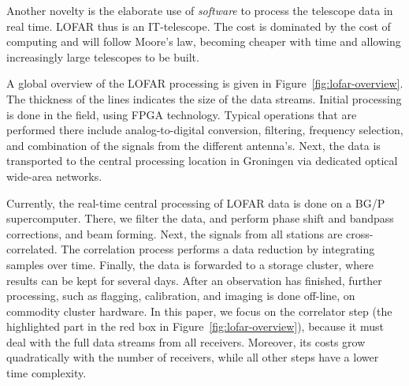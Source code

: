 \documentclass{article}
\newcommand{\longversion}[1]{}
\begin{document}
Another novelty is the elaborate
use of \emph{software\/} to process the telescope data in real time.
LOFAR thus is an IT-telescope. 
The cost
is dominated by the cost of computing and will follow Moore's law,
becoming cheaper with time and allowing increasingly large telescopes
to be built. 
\longversion{
LOFAR will enable exciting new science cases.  First, we expect to see
the \emph{Epoch of Reionization\/} (EoR), the time that the first star
galaxies and quasars were formed. Second, LOFAR offers a unique
possibility in particle astrophysics for studying the origin of
high-energy \emph{cosmic rays}.  Third, LOFAR's ability to
continuously monitor a large fraction of the sky makes it uniquely
suited to find new \emph{pulsars} and to study \emph{transient
  sources}.  Since LOFAR has no moving parts, it can instantaneously
switch focus to some galactic event.  Fourth, \emph{Deep Extragalactic
  Surveys\/} will be carried out to find the most distant radio
galaxies and study star-forming galaxies.  Fifth, LOFAR will be
capable of observing the so far unexplored radio waves emitted by
\emph{cosmic magnetic fields}.  For a more extensive description of
the astronomical aspects of the LOFAR system, see De Bruyn
et.~al.~\cite{Bruyn:02}.
}
A global overview of the LOFAR processing is given in
Figure~\ref{fig:lofar-overview}. The thickness of the lines indicates
the size of the data streams.  Initial processing is done in the
field, using FPGA technology.  Typical operations that are performed
there include analog-to-digital conversion, filtering, frequency
selection, and combination of the signals from the different
antenna's.  Next, the data is transported to the central processing
location in Groningen via dedicated optical wide-area networks.

Currently, the real-time central processing of LOFAR data is done on
a BG/P supercomputer.  There, we filter the data, and
perform phase shift and bandpass corrections, and beam forming.
Next, the signals from all stations are cross-correlated.  The
correlation process performs a data reduction by integrating samples
over time.  Finally, the data is forwarded to a storage cluster, where
results can be kept for several days.  After an observation has
finished, further processing, such as flagging, calibration, and imaging is done off-line, on commodity cluster
hardware.  
In this paper, we focus on the correlator step (the
highlighted part in the red box in
Figure~\ref{fig:lofar-overview}), because it must deal with the
full data streams from all receivers. Moreover, its costs grow
quadratically with the number of receivers, while all other steps have
a lower time complexity.
\end{document}
